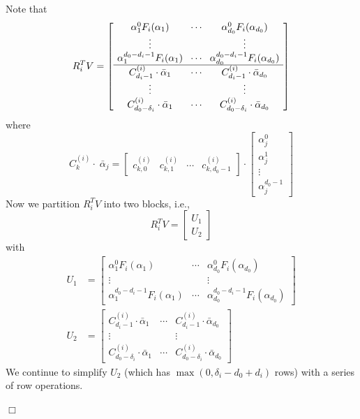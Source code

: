 \documentclass{article}
\newenvironment{proof}{\noindent{\em Proof:}}{$\Box$~\\}
\begin{document}
\begin{proof}
Note that
\[
R_i^TV
\setlength{\arraycolsep}{4pt}
= \left[ {\begin{array}{*{20}{c}}
{\alpha _1^0{F_i}({\alpha _1})}& \cdots &{\alpha _{{d_0}}^0{F_i}({\alpha _{{d_0}}})}\\
 \vdots &{}& \vdots \\
{\alpha _1^{{d_0} - {d_i} - 1}{F_i}({\alpha _1})}& \cdots &{\alpha _{{d_0}}^{{d_0} - {d_i} - 1}{F_i}({\alpha _{{d_0}}})}\\\hline
{C_{{d_i}-1}^{(i)} \cdot {{\bar \alpha }_1}}& \cdots &{C_{{d_i}-1}^{(i)} \cdot {{\bar \alpha }_{{d_0}}}}\\
 \vdots &{}& \vdots \\
{C_{{d_0-\delta _i}}^{(i)} \cdot {{\bar \alpha }_1}}& \cdots &{C_{{d_0-\delta_i}}^{(i)} \cdot {{\bar \alpha }_{{d_0}}}}
\end{array}} \right]
\]
where
$$C_k^{(i)} \cdot \;{\bar \alpha _j} = \left[ {\begin{array}{*{20}{c}}
{c_{k ,0}^{(i)}}&{c_{k ,1}^{(i)}}& \cdots &{c_{k,{d_0} - 1}^{(i)}}
\end{array}} \right] \cdot {\begin{bmatrix}
{\alpha _j^0}\\[3pt]{\alpha _j^1}\\[3pt] \vdots \\[3pt]{\alpha _j^{{d_0} - 1}}
\end{bmatrix}}$$
Now we partition $R_i^TV$ into two blocks, i.e.,
\[R_i^TV=\begin{bmatrix}U_1\\[3pt]U_2\end{bmatrix}\]
with
\begin{align*}
U_1&=\begin{bmatrix}
{\alpha _1^0{F_i}({\alpha _1})}& \cdots &{\alpha _{{d_0}}^0{F_i}({\alpha _{{d_0}}})}\\
 \vdots &{}& \vdots \\
{\alpha _1^{{d_0} - {d_i} - 1}{F_i}({\alpha _1})}& \cdots &{\alpha _{{d_0}}^{{d_0} - {d_i} - 1}{F_i}({\alpha _{{d_0}}})}
\end{bmatrix}\\
U_2&=\begin{bmatrix}
{C_{{d_i}-1}^{(i)} \cdot {{\bar \alpha }_1}}& \cdots &{C_{{d_i}-1}^{(i)} \cdot {{\bar \alpha }_{{d_0}}}}\\
 \vdots &{}& \vdots \\
{C_{{d_0-\delta _i}}^{(i)} \cdot {{\bar \alpha }_1}}& \cdots &{C_{{d_0-\delta_i}}^{(i)} \cdot {{\bar \alpha }_{{d_0}}}}
\end{bmatrix}
\end{align*}
We continue to simplify $U_2$ (which has $\max(0,\delta_i-d_0+d_i)$ rows) with a series of row operations.


\end{proof}
\end{document}
